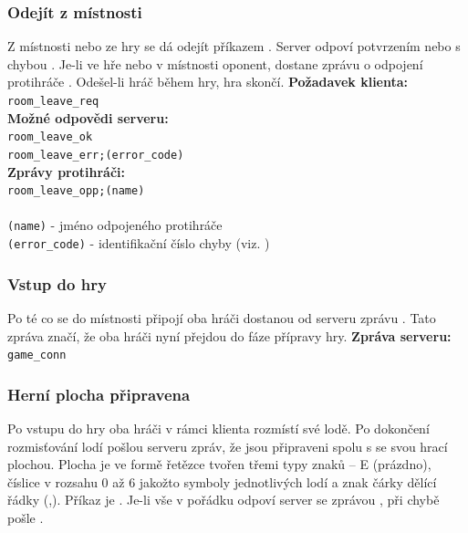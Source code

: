 \documentclass[12pt, a4paper]{article} %
\begin{document}
	\subsubsection{Odejít z místnosti}
	\par Z místnosti nebo ze hry se dá odejít příkazem . Server odpoví potvrzením nebo s chybou .
	Je-li ve hře nebo v místnosti oponent, dostane zprávu o odpojení protihráče . Odešel-li hráč během hry, hra skončí.	
	\textbf{Požadavek klienta:}\\
	\texttt{room\_leave\_req}\\
	\textbf{Možné odpovědi serveru:}\\
	\texttt{room\_leave\_ok}\\
	\texttt{room\_leave\_err;(error\_code)}\\
	\textbf{Zprávy protihráči:}\\
	\texttt{room\_leave\_opp;(name)}\\\\
	\texttt{(name)} - jméno odpojeného protihráče\\
	\texttt{(error\_code)} - identifikační číslo chyby (viz. )
	\subsubsection{Vstup do hry}
	\par Po té co se do místnosti připojí oba hráči dostanou od serveru zprávu . Tato zpráva značí, že oba hráči nyní přejdou do fáze přípravy hry.
	\textbf{Zpráva serveru:}\\
	\texttt{game\_conn}\\
	
	\subsubsection{Herní plocha připravena}
	\label{ssec:game_ready}
	\par Po vstupu do hry oba hráči v rámci klienta rozmístí své lodě. Po dokončení rozmisťování lodí pošlou serveru zpráv, že jsou připraveni spolu s se svou hrací plochou. Plocha je ve formě řetězce tvořen třemi typy znaků – E (prázdno), číslice v rozsahu 0 až 6 jakožto symboly jednotlivých lodí a znak čárky dělící řádky (,). Příkaz je .  Je-li vše v pořádku odpoví server se zprávou , při chybě pošle .
	
\end{document}
